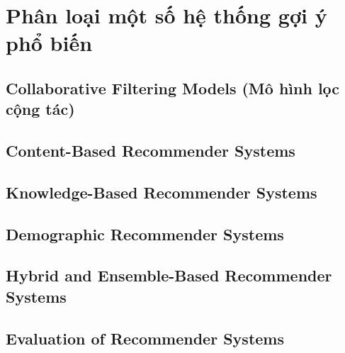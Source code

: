 \documentclass[14pt]{article}
\begin{document}
	\section{Phân loại một số hệ thống gợi ý phổ biến}
	
		\subsection{Collaborative Filtering Models (Mô hình lọc cộng tác)}
		
		\subsection{Content-Based Recommender Systems}
		
		\subsection{Knowledge-Based Recommender Systems}
		
		\subsection{Demographic Recommender Systems}
		
		\subsection{Hybrid and Ensemble-Based Recommender Systems}
		
		\subsection{Evaluation of Recommender Systems}
		
\end{document}
